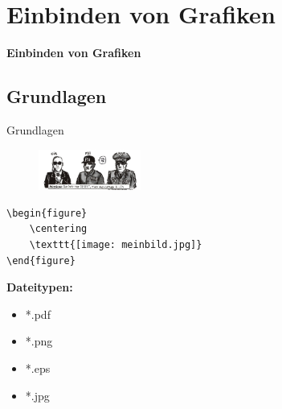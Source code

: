 \section{Einbinden von Grafiken}
\begin{frame}[c]
	\begin{center}
		\LARGE \textbf{Einbinden von Grafiken}
	\end{center}
\end{frame}
\subsection{Grundlagen}
\begin{frame}[c]
	\begin{center}
		\large Grundlagen
	\end{center}
\end{frame}
\begin{frame}[fragile]
	\Ausgabe
	\begin{outputbox}
		\begin{figure}
			\centering
			\includegraphics[width=0.3\textwidth]{img/loewenjagd}
		\end{figure}
	\end{outputbox}

	\pause\Code
	\begin{lstlisting}
\begin{figure}
	\centering
	\texttt{[image: meinbild.jpg]}
\end{figure}
	\end{lstlisting}

	\pause\textbf{Dateitypen:}\vspace{-0.2cm}
	\begin{itemize}
		\item *.pdf
		\item *.png
		\item *.eps
		\item *.jpg
	\end{itemize}
\end{frame}
